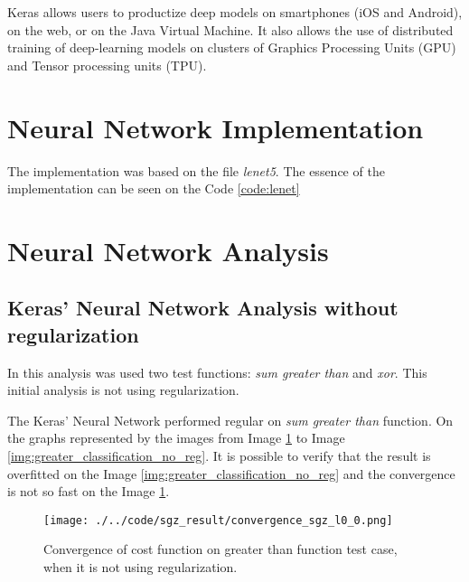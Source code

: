 \documentclass[journal]{IEEEtran}
\begin{document}
Keras allows users to productize deep models on smartphones (iOS and Android), on the web, or on the Java Virtual Machine. It also allows the use of distributed training of deep-learning models on clusters of Graphics Processing Units (GPU) and Tensor processing units (TPU).

\section{Neural Network Implementation}

The implementation was based on the file \textit{lenet5}. The essence of the implementation can be seen on the Code \ref{code:lenet}



\section{Neural Network Analysis}

\subsection{Keras' Neural Network Analysis without regularization}

In this analysis was used two test functions: \textit{sum greater than} and \textit{xor}. This initial analysis is not using regularization.

The Keras' Neural Network performed regular on \textit{sum greater than} function. On the graphs represented by the images from Image \ref{img:greater_cost_no_reg} to Image \ref{img:greater_classification_no_reg}. It is possible to verify that the result is overfitted on the Image \ref{img:greater_classification_no_reg} and the convergence is not so fast on the Image \ref{img:greater_cost_no_reg}.

\begin{figure}
  \begin{center}
  \texttt{[image: ./../code/sgz\_result/convergence\_sgz\_l0\_0.png]}
  \caption{Convergence of cost function on greater than function test case, when it is not using regularization.}
  \label{img:greater_cost_no_reg}
  \end{center}
\end{figure}
\end{document}
